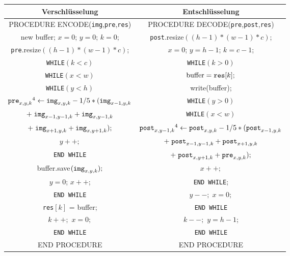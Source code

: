 \documentclass[a4paper,12pt]{article}
\begin{document}
\begin{tabular}{c|c}
Verschlüsselung & Entschlüsselung
\\
\hline
PROCEDURE ENCODE({\tt{img}},{\tt{pre}},{\tt{res}}) & PROCEDURE DECODE({\tt{pre}},{\tt{post}},{\tt{res}})
\\
new buffer; $x=0$; $y=0$; $k=0$; & {\tt{post}}.resize$((h-1)*(w-1)*c)$;
\\
{\tt{pre}}.resize$((h-1)*(w-1)*c)$; & $x=0$; $y=h-1$; $k=c-1$;
\\
{\tt{WHILE}}$(k < c)$ &                  {\tt{WHILE}}$(k > 0)$
\\
{\tt{WHILE}}$(x < w)$ &               $\text{buffer} = \text{{\tt{res}}}[k];$
\\
{\tt{WHILE}}$(y < h)$ &            write(buffer);
\\
$\text{{\tt{pre}}}_{x,y,k}\footnotemark[4]\leftarrow \text{{\tt{img}}}_{x,y,k} - 1/5 *(\text{{\tt{img}}}_{x-1,y,k}$ & {\tt{WHILE}}$(y > 0)$ 
\\
$+\;\text{{\tt{img}}}_{x-1,y-1,k} + \text{{\tt{img}}}_{x,y-1,k}$  &  {\tt{WHILE}}$(x<w)$
\\
$+\;\text{{\tt{img}}}_{x+1,y,k} + \text{{\tt{img}}}_{x,y+1,k});$ & $\text{{\tt{post}}}_{x,y-1,k}\footnotemark[4]\leftarrow \text{{\tt{post}}}_{x,y,k} - 1/5 *(\text{{\tt{post}}}_{x-1,y,k} $ 
\\
$y++;$ &   $+\;\text{{\tt{post}}}_{x-1,y-1,k} + \text{{\tt{post}}}_{x+1,y,k}$  
\\
{\tt{END {\tt{WHILE}}}}  & $+\;\text{{\tt{post}}}_{x,y+1,k} + \text{{\tt{pre}}}_{x,y,k});$
\\
buffer.save$(\text{{\tt{img}}}_{x,y,k});$  & $x++;$
\\
$y=0$; $x++$;  &   {\tt{END {\tt{WHILE}}}}; 
\\
{\tt{END {\tt{WHILE}}}}   & $y--;\;x=0;$ 
\\
{\tt{res}}$[k]$ = buffer;  &  {\tt{END {\tt{WHILE}}}} 
\\
$k++;$ $x=0;$   &   $k--;$ $y=h-1$;
\\
{\tt{END {\tt{WHILE}}}} & {\tt{END {\tt{WHILE}}}} 
\\
END PROCEDURE & END PROCEDURE
\end{tabular}
\end{document}
